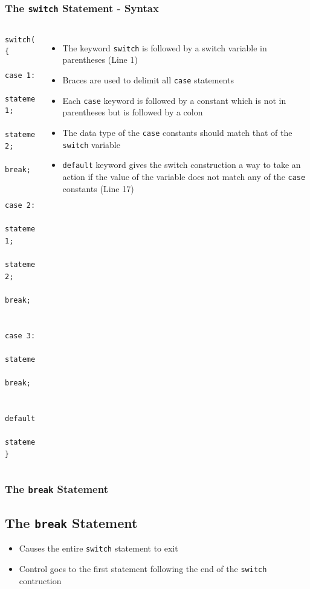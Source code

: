 \documentclass{beamer}
\begin{document}
\begin{frame}[fragile]
    \frametitle{The \texttt{switch} Statement - Syntax}
    \begin{columns}
        \lstset{style=mystyle}
        \begin{lstlisting}
switch(n)
{
    case 1:
    statement 1;
    statement 2;
    break;

    case 2:
    statement 1;
    statement 2;
    break;

    case 3:
    statement;
    break;

    default:
    statement;
}
\end{lstlisting}
            \begin{itemize}
            \item The keyword \texttt{switch} is followed by a switch variable in parentheses (Line 1)
            \item Braces are used to delimit all \texttt{case} statements
            \item Each \texttt{case} keyword is followed by a constant which is not in parentheses but is followed by a colon
            \item The data type of the \texttt{case} constants should match that of the \texttt{switch} variable
            \item \texttt{default} keyword gives the switch construction a way to take an action if the value of the variable does not match any of the \texttt{case} constants (Line 17)
            \end{itemize}
    \end{columns}
\end{frame}

\begin{frame}
    \frametitle{The \texttt{break} Statement}
    \subsection{The \texttt{break} Statement} %
    \label{sub:the_break_statement}
    \begin{itemize}
        \item Causes the entire \texttt{switch} statement to exit
        \item Control goes to the first statement following the end of the \texttt{switch} contruction
    \end{itemize}
\end{frame}
\end{document}
